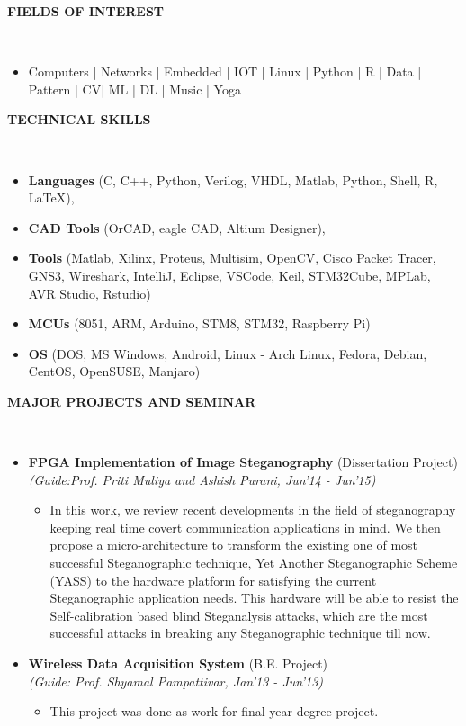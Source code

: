 \documentclass[a4paper,10pt]{article}
\newcommand{\isep}{-2 pt}
\newcommand{\lsep}{-0.5cm}
\newcommand{\resheading}[1]{{\small \colorbox{mygrey}{\begin{minipage}{0.975\textwidth}{\textbf{#1 \vphantom{p\^{E}}}}\end{minipage}}}}
\begin{document}
\resheading{\textbf{FIELDS OF INTEREST} }\\[\lsep]
\begin{itemize}
\item \noindent Computers | Networks | Embedded | IOT | Linux | Python | R | Data | Pattern | CV| ML | DL | Music | Yoga
\end{itemize}

\resheading{\textbf{TECHNICAL SKILLS} }\\[\lsep]
\begin{itemize}
\item \noindent \textbf{Languages} (C, C++, Python, Verilog, VHDL, Matlab, Python, Shell, R, \LaTeX), 
\item \noindent \textbf{CAD Tools} (OrCAD, eagle CAD, Altium Designer),
\item \noindent \textbf{Tools} (Matlab, Xilinx, Proteus, Multisim, OpenCV, Cisco Packet Tracer, GNS3, Wireshark, IntelliJ, Eclipse, VSCode, Keil, STM32Cube, MPLab, AVR Studio, Rstudio) 
\item \noindent \textbf{MCUs} (8051, ARM, Arduino, STM8, STM32, Raspberry Pi)
\item \noindent \textbf{OS} (DOS, MS Windows, Android, Linux - Arch Linux, Fedora, Debian, CentOS, OpenSUSE, Manjaro)
\end{itemize}

\resheading{\textbf{MAJOR PROJECTS AND SEMINAR} }\\[\lsep]
\begin{itemize}
\item \textbf{FPGA Implementation of Image Steganography} (Dissertation Project) \\
 \emph{(Guide:Prof. Priti Muliya and Ashish Purani, Jun'14 - Jun'15)} \\[-0.6cm]
	\begin{itemize}\itemsep \isep
	\item In this work, we review recent developments in the field of steganography keeping real time covert communication applications in mind. We then propose a micro-architecture to transform the existing one of most successful Steganographic technique, Yet Another Steganographic Scheme (YASS) to the hardware platform for satisfying the current Steganographic application needs. This hardware will be able to resist the Self-calibration based blind Steganalysis attacks, which are the most successful attacks in breaking any Steganographic technique till now.
	\end{itemize}

\item \textbf{Wireless Data Acquisition System} (B.E. Project) \\
 \emph{(Guide: Prof. Shyamal Pampattivar, Jan'13 - Jun'13)} \\[-0.6cm]
	\begin{itemize}\itemsep \isep
	\item This project was done as work for final year degree project.
	\end{itemize}
\end{itemize}
\end{document}
